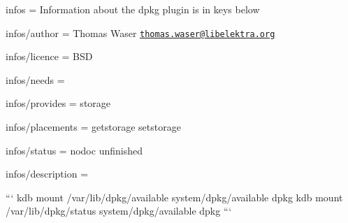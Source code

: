
\begin{DoxyItemize}
\item infos = Information about the dpkg plugin is in keys below
\item infos/author = Thomas Waser \href{mailto:thomas.waser@libelektra.org}{\tt thomas.\+waser@libelektra.\+org}
\item infos/licence = B\+S\+D
\item infos/needs =
\item infos/provides = storage
\item infos/placements = getstorage setstorage
\item infos/status = nodoc unfinished
\item infos/description =
\end{DoxyItemize}

``` kdb mount /var/lib/dpkg/available system/dpkg/available dpkg kdb mount /var/lib/dpkg/status system/dpkg/available dpkg ``` 